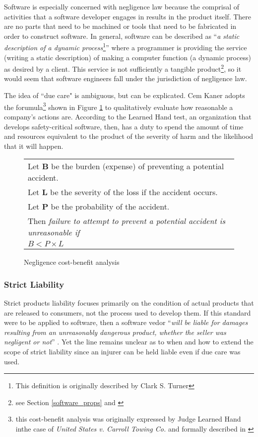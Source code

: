 Software is especially concerned with negligence law because the comprisal of
activities that a software developer engages in results in the product itself.
There are no parts that need to be machined or tools that need to be fabricated
in order to construct software. In general, software can be described as 
``\textit{a static description of a dynamic process}\footnote{This definition
is originally described by Clark S. Turner}'' where a programmer is providing
the service (writing a static description) of making a computer function (a
dynamic process) as desired by a client. This service is not sufficiently a
tangible product\footnote{see Section \ref{software_props} and
\cite{Turner2000}}, so it would seem that software engineers fall under the
jurisdiction of negligence law.

The idea of ``due care" is ambiguous, but can be explicated. Cem Kaner adopts
the forumula\footnote{this cost-benefit analysis was originally expressed by
Judge Learned Hand inthe case of  \textit{United States v. Carroll Towing Co.}
and formally described in \cite{Kaner_neg_1995}} shown in Figure 
\ref{fig:negligence} to qualitatively evaluate how reasonable a company's
actions are. According to the Learned Hand test, an organization that develops 
safety-critical software, then, has a duty to spend the amount of time and
resources equivalent to the product of the severity of harm and the likelihood
that it will happen.

\begin{figure}
\begin{tabular}{|l|}
\hline
	Let \textbf{B} be the burden (expense) of preventing a potential accident.\\
	Let \textbf{L} be the severity of the loss if the accident occurs.\\
	Let \textbf{P} be the probability of the accident.\\[6pt]
	Then \textit{failure to attempt to prevent a potential accident is 
	unreasonable if}\\[8pt]

      \centerline{\(B < P \times L\)}
\\[3pt]
\hline
\end{tabular}
\caption{Negligence cost-benefit analysis}
\label{fig:negligence}
\end{figure}

\subsubsection{Strict Liability}
Strict products liability focuses primarily on the condition of actual products
that are released to consumers, not the process used to develop them. If this
standard were to be applied to software, then a software vedor ``\textit{will be
liable for damages resulting from an unreasonably dangerous product, whether the
seller was negligent or not}'' \cite{Burgunder2004}. Yet the line remains
unclear as to when and how to extend the scope of strict liability since an
injurer can be held liable even if due care was used.

